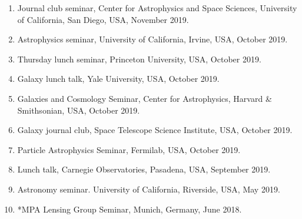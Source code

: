 \documentclass[margin, line]{res}
\begin{document}
\begin{resume}
\begin{enumerate}
	\item Journal club seminar, Center for Astrophysics and Space Sciences, University of California, San Diego, USA, November 2019.
	\item Astrophysics seminar, University of California, Irvine, USA, October 2019.
	\item Thursday lunch seminar, Princeton University, USA, October 2019.
	\item Galaxy lunch talk, Yale University, USA, October 2019.
	\item Galaxies and Cosmology Seminar, Center for Astrophysics, Harvard \& Smithsonian, USA, October 2019.
	\item Galaxy journal club, Space Telescope Science Institute, USA, October 2019.
	\item Particle Astrophysics Seminar, Fermilab, USA, October 2019.
	\item Lunch talk, Carnegie Observatories, Pasadena, USA, September 2019.
	\item Astronomy seminar. University of California, Riverside, USA, May 2019. 
	\item {*}MPA Lensing Group Seminar, Munich, Germany, June 2018.
\end{enumerate}



\end{resume}
\end{document}
